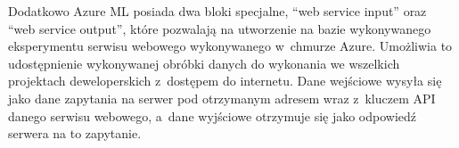Dodatkowo Azure ML posiada dwa bloki specjalne, ``web service input'' oraz ``web service output'', które pozwalają na utworzenie na bazie wykonywanego eksperymentu serwisu webowego wykonywanego w~chmurze Azure.
Umożliwia to udostępnienie wykonywanej obróbki danych do wykonania we wszelkich projektach deweloperskich z~dostępem do internetu.
Dane wejściowe wysyła się jako dane zapytania na serwer pod otrzymanym adresem wraz z~kluczem API danego serwisu webowego, a~dane wyjściowe otrzymuje się jako odpowiedź serwera na to zapytanie.
